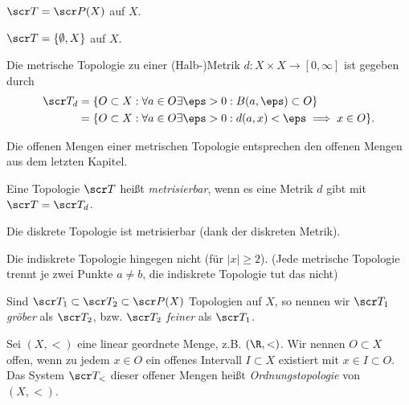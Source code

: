 \begin{ex}
	$\scr T = \scr P(X)$ auf $X$.
\end{ex}

\begin{ex}
	$\scr T = \{\emptyset, X\}$ auf $X$.
\end{ex}

\begin{ex} \label{ex:metric_topology}
	Die metrische Topologie zu einer (Halb-)Metrik $d: X \times X \to [0,\infty]$ ist gegeben durch
	\begin{align*}
		\scr T_d
		&= \{ O \subset X : \forall a \in O \exists \eps > 0 : B(a,\eps) \subset O \} \\
		&= \{ O \subset X : \forall a \in O \exists \eps > 0 : d(a,x) < \eps \implies x \in O \}.
	\end{align*}
\end{ex}

\begin{nt}
	Die offenen Mengen einer metrischen Topologie entsprechen den offenen Mengen aus dem letzten Kapitel.
\end{nt}

\begin{df}
	Eine Topologie $\scr T$ heißt \emph{metrisierbar}, wenn es eine Metrik $d$ gibt mit $\scr T = \scr T_d$.
\end{df}

\begin{ex}
	Die diskrete Topologie ist metrisierbar (dank der diskreten Metrik).

	Die indiskrete Topologie hingegen nicht (für $|x| \ge 2$).
	(Jede metrische Topologie trennt je zwei Punkte $a \neq b$, die indiskrete Topologie tut das nicht)
\end{ex}

\begin{df}
	Sind $\scr T_1 \subset \scr T_2 \subset \scr P(X)$ Topologien auf $X$, so nennen wir $\scr T_1$ \emph{gröber} als $\scr T_2$, bzw. $\scr T_2$ \emph{feiner} als $\scr T_1$.
\end{df}

\begin{ex}
	Sei $(X,<)$ eine linear geordnete Menge, z.B. $(\R,<)$.
	Wir nennen $O \subset X$ offen, wenn zu jedem $x \in O$ ein offenes Intervall $I \subset X$ existiert mit $x \in I \subset O$.
	Das System $\scr T_<$ dieser offener Mengen heißt \emph{Ordnungstopologie} von $(X,<)$.
\end{ex}

